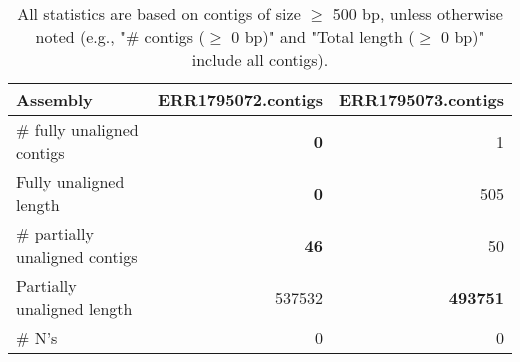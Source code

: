 \documentclass[12pt,a4paper]{article}
\begin{document}
\begin{table}[ht]
\begin{center}
\caption{All statistics are based on contigs of size $\geq$ 500 bp, unless otherwise noted (e.g., "\# contigs ($\geq$ 0 bp)" and "Total length ($\geq$ 0 bp)" include all contigs).}
\begin{tabular}{|l*{2}{|r}|}
\hline
Assembly & ERR1795072.contigs & ERR1795073.contigs \\ \hline
\# fully unaligned contigs & {\bf 0} & 1 \\ \hline
Fully unaligned length & {\bf 0} & 505 \\ \hline
\# partially unaligned contigs & {\bf 46} & 50 \\ \hline
Partially unaligned length & 537532 & {\bf 493751} \\ \hline
\# N's & 0 & 0 \\ \hline
\end{tabular}
\end{center}
\end{table}
\end{document}

